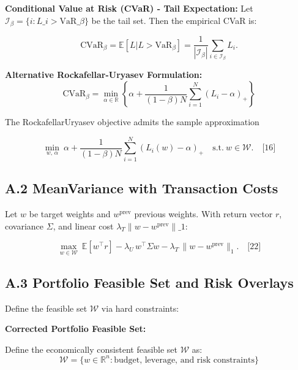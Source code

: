 \documentclass[11pt]{article}
\begin{document}
\textbf{Conditional Value at Risk (CVaR) - Tail Expectation:}
Let $\mathcal{I}_\beta=\{i: L\_i > \mathrm{VaR}\_\beta\}$ be the tail set. Then the empirical CVaR is:

\begin{equation}
\mathrm{CVaR}_\beta = \mathbb{E}[L | L > \mathrm{VaR}_\beta] = \frac{1}{|\mathcal{I}_\beta|}\sum_{i\in\mathcal{I}_\beta} L_i.
\end{equation}

\textbf{Alternative Rockafellar-Uryasev Formulation:}
\begin{equation}
\mathrm{CVaR}_\beta = \min_{\alpha \in \mathbb{R}} \left\{ \alpha + \frac{1}{(1-\beta)N}\sum_{i=1}^N (L_i-\alpha)_+ \right\}
\end{equation}

The RockafellarUryasev objective admits the sample approximation

\begin{equation}
\min_{w,\,\alpha}\ \alpha + \frac{1}{(1-\beta)N}\sum_{i=1}^N (L_i(w)-\alpha)_+\quad\text{s.t.}\ w\in\mathcal{W}.\quad\text{[16]}
\end{equation}

\subsection{A.2 MeanVariance with Transaction Costs}

Let $w$ be target weights and $w^{\text{prev}}$ previous weights. With return vector $r$, covariance $\Sigma$, and linear cost $\lambda_T\|w-w^{\text{prev}}\|\_1$:

\begin{equation}
\max_{w\in\mathcal{W}}\ \mathbb{E}[w^\top r] - \lambda_U\, w^\top\Sigma w - \lambda_T\,\|w-w^{\text{prev}}\|_1.\quad\text{[22]}
\end{equation}

\subsection{A.3 Portfolio Feasible Set and Risk Overlays}

Define the feasible set $\mathcal{W}$ via hard constraints:

\textbf{Corrected Portfolio Feasible Set:}

Define the economically consistent feasible set $\mathcal{W}$ as:
\begin{equation}
\mathcal{W} = \{w \in \mathbb{R}^n : \text{budget, leverage, and risk constraints}\}
\end{equation}
\end{document}
